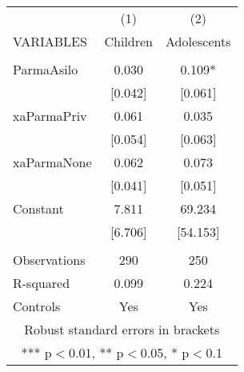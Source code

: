 \begin{tabular}{lcc} \hline
 & (1) & (2) \\
VARIABLES & Children & Adolescents \\ \hline
 &  &  \\
ParmaAsilo & 0.030 & 0.109* \\
 & [0.042] & [0.061] \\
xaParmaPriv & 0.061 & 0.035 \\
 & [0.054] & [0.063] \\
xaParmaNone & 0.062 & 0.073 \\
 & [0.041] & [0.051] \\
Constant & 7.811 & 69.234 \\
 & [6.706] & [54.153] \\
 &  &  \\
Observations & 290 & 250 \\
R-squared & 0.099 & 0.224 \\
 Controls & Yes & Yes \\ \hline
\multicolumn{3}{c}{ Robust standard errors in brackets} \\
\multicolumn{3}{c}{ *** p$<$0.01, ** p$<$0.05, * p$<$0.1} \\
\end{tabular}
